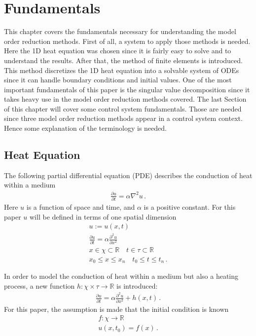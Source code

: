 \chapter{Fundamentals}
This chapter covers the fundamentals necessary for understanding the model order reduction methods. First of all, a system to apply those methods is needed. Here the 1D heat equation was chosen since it is fairly easy to solve and to understand the results. After that, the method of finite elements is introduced. This method discretizes the 1D heat equation into a solvable system of ODEs since it can handle boundary conditions and initial values. One of the most important fundamentals of this paper is the singular value decomposition since it takes heavy use in the model order reduction methods covered. The last Section of this chapter will cover some control system fundamentals. Those are needed since three model order reduction methods appear in a control system context. Hence some explanation of the terminology is needed.
\section{Heat Equation} \label{HE}
The following partial differential equation (PDE) describes the conduction of heat  within a medium
\begin{gather}
\frac{\partial u}{\partial t} = \alpha \nabla^{2} u\,. \label{heat}
\end{gather}
Here \(u\) is a function of space and time, and \(\alpha\) is a positive constant.
For this paper \(u\) will be defined in terms of one spatial dimension \cite{Gustafsson2011}
\begin{gather}
u := u(x, t) \\
\frac{\partial u}{\partial t} = \alpha \frac{\partial^{2} u}{\partial x^{2}} \\
x \in \chi \subset \mathbb{R} \quad t \in \tau \subset \mathbb{R} \\
x_{0} \leq x \leq x_{n} \quad t_{0} \leq t \leq t_{n}\,.
\end{gather}

In order to model the conduction of heat within a medium but also a heating process, a new function \(h: \chi \times \tau \rightarrow  \mathbb{R}\) is introduced:
\begin{gather}
\frac{\partial u}{\partial t} = \alpha \frac{\partial^{2} u}{\partial x^{2}} + h(x,t)\,. \label{eq-1d-h}
\end{gather}
For this paper, the assumption is made that the initial condition is known
\begin{gather}
f: \chi \rightarrow \mathbb{R} \\
u(x, t_{0}) = f(x)\,.
\end{gather} 


